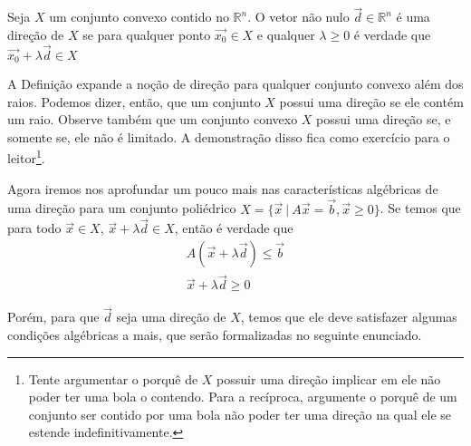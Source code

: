\begin{def:direção}
	Seja $X$ um conjunto convexo contido no $\mathbb{R}^n$. O vetor não nulo $\vec{d} \in \mathbb{R}^n$ é uma direção de $X$ se para qualquer ponto $\vec{x_0} \in X$ e qualquer $\lambda \geq 0$ é verdade que $\vec{x_0} + \lambda \vec{d} \in X$
\end{def:direção}

A Definição expande a noção de direção para qualquer conjunto convexo além dos raios. Podemos dizer, então, que um conjunto $X$ possui uma direção se ele contém um raio. Observe também que um conjunto convexo $X$ possui uma direção se, e somente se, ele não é limitado. A demonstração disso fica como exercício para o leitor\footnote{Tente argumentar o porquê de $X$ possuir uma direção implicar em ele não poder ter uma bola o contendo. Para a recíproca, argumente o porquê de um conjunto ser contido por uma bola não poder ter uma direção na qual ele se estende indefinitivamente.}.

Agora iremos nos aprofundar um pouco mais nas características algébricas de uma direção para um conjunto poliédrico $X = \{\vec{x}\ |\ A\vec{x} = \vec{b}, \vec{x} \geq 0\}$. Se temos que para todo $\vec{x} \in X$, $\vec{x} + \lambda \vec{d} \in X$, então é verdade que
\begin{gather*}
	A (\vec{x} + \lambda \vec{d}) \leq \vec{b} \\
	\vec{x} + \lambda \vec{d} \geq 0
\end{gather*}

Porém, para que $\vec{d}$ seja uma direção de $X$, temos que ele deve satisfazer algumas condições algébricas a mais, que serão formalizadas no seguinte enunciado.

